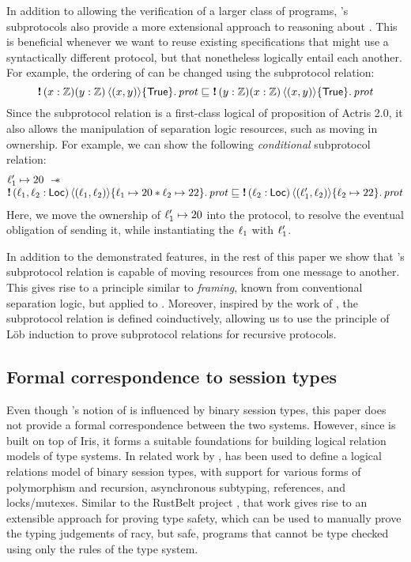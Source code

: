 In addition to allowing the verification of a larger class of programs,
's subprotocols also provide a more extensional approach to reasoning about \pname.
This is beneficial whenever we want to reuse existing specifications that might
use a syntactically different protocol, but that nonetheless logically
entail each another.
For example, the ordering of \binders can be changed using the subprotocol
relation:
\[
  \sendprot{(\var:\integer) (\varB:\integer)}{(\var,\varB)}{\TRUE}\prot
  \subprotop
  \sendprot{(\varB:\integer) (\var:\integer)}{(\var,\varB)}{\TRUE}\prot
\]
Since the subprotocol relation is a first-class logical of proposition of
Actris 2.0, it also allows the manipulation of separation logic resources,
such as moving in ownership.
For example,
we can show the following \emph{conditional} subprotocol relation:
\[
\begin{array}[b]{@{} l @{}}
\loc_1' \mapsto 20 \  \wand \\
  \sendprot {(\loc_1,\loc_2:\Loc)} {(\loc_1,\loc_2)}
    {\loc_1 \mapsto 20 * \loc_2 \mapsto 22} \prot
    \subprotop
   \sendprot {(\loc_2:\Loc)} {(\loc_1',\loc_2)}
    {\loc_2 \mapsto 22} \prot
\end{array}
\]
Here, we move the ownership of $\ell_1' \mapsto 20$ into the protocol,
to resolve the eventual obligation of sending it, while instantiating the
\binder $\ell_1$ with $\ell_1'$.

In addition to the demonstrated features, in the rest of this paper we show
that 's subprotocol relation is capable of moving resources from one
message to another.
This gives rise to a principle similar to \emph{framing}, known from conventional
separation logic, but applied to \pname.
Moreover, inspired by the work of \citet{DBLP:journals/fuin/BrandtH98}, the
subprotocol relation is defined coinductively, allowing us to use the principle of Löb induction
to prove subprotocol relations for recursive protocols.

\subsection{Formal correspondence to session types}

Even though \lname's notion of \pname is influenced by binary session types, this paper does not
provide a formal correspondence between the two systems.
However, since \lname is built on top of Iris, it forms a suitable foundations
for building logical relation models of type systems.
In related work by \citet{actris-logrel}, \lname has been used to define a logical
relations model of binary session types, with support for various forms of
polymorphism and recursion, asynchronous subtyping, references, and locks/mutexes.
Similar to the RustBelt project \cite{jung-POPL2018}, that work gives rise
to an extensible approach for proving type safety, which can be
used to manually prove the typing judgements of racy, but safe, programs that cannot
be type checked using only the rules of the type system.

